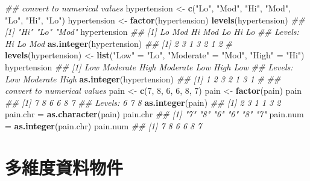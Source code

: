 \documentclass[
]{book}
\newenvironment{Shaded}{\begin{snugshade}}{\end{snugshade}}
\newcommand{\CommentTok}[1]{\textcolor[rgb]{0.56,0.35,0.01}{\textit{#1}}}
\newcommand{\DecValTok}[1]{\textcolor[rgb]{0.00,0.00,0.81}{#1}}
\newcommand{\KeywordTok}[1]{\textcolor[rgb]{0.13,0.29,0.53}{\textbf{#1}}}
\newcommand{\NormalTok}[1]{#1}
\newcommand{\StringTok}[1]{\textcolor[rgb]{0.31,0.60,0.02}{#1}}
\begin{document}
\begin{Shaded}
\begin{Highlighting}[]
\CommentTok{\#\# convert to numerical values}
\NormalTok{hypertension \textless{}{-}}\StringTok{ }\KeywordTok{c}\NormalTok{(}\StringTok{"Lo"}\NormalTok{, }\StringTok{"Mod"}\NormalTok{, }\StringTok{"Hi"}\NormalTok{, }\StringTok{"Mod"}\NormalTok{, }\StringTok{"Lo"}\NormalTok{, }\StringTok{"Hi"}\NormalTok{, }\StringTok{"Lo"}\NormalTok{)}
\NormalTok{hypertension \textless{}{-}}\StringTok{ }\KeywordTok{factor}\NormalTok{(hypertension)}
\KeywordTok{levels}\NormalTok{(hypertension)}
\CommentTok{\#\# [1] "Hi"  "Lo"  "Mod"}
\NormalTok{hypertension}
\CommentTok{\#\# [1] Lo  Mod Hi  Mod Lo  Hi  Lo }
\CommentTok{\#\# Levels: Hi Lo Mod}
\KeywordTok{as.integer}\NormalTok{(hypertension)}
\CommentTok{\#\# [1] 2 3 1 3 2 1 2}
\CommentTok{\#}
\KeywordTok{levels}\NormalTok{(hypertension) \textless{}{-}}\StringTok{ }\KeywordTok{list}\NormalTok{(}\StringTok{"Low"}\NormalTok{ =}\StringTok{ "Lo"}\NormalTok{, }
                             \StringTok{"Moderate"}\NormalTok{ =}\StringTok{ "Mod"}\NormalTok{, }
                             \StringTok{"High"}\NormalTok{ =}\StringTok{ "Hi"}\NormalTok{)}
\NormalTok{hypertension}
\CommentTok{\#\# [1] Low      Moderate High     Moderate Low      High     Low     }
\CommentTok{\#\# Levels: Low Moderate High}
\KeywordTok{as.integer}\NormalTok{(hypertension) }
\CommentTok{\#\# [1] 1 2 3 2 1 3 1}
\CommentTok{\#}
\CommentTok{\#\# convert to numerical values}
\NormalTok{pain \textless{}{-}}\StringTok{ }\KeywordTok{c}\NormalTok{(}\DecValTok{7}\NormalTok{, }\DecValTok{8}\NormalTok{, }\DecValTok{6}\NormalTok{, }\DecValTok{6}\NormalTok{, }\DecValTok{8}\NormalTok{, }\DecValTok{7}\NormalTok{)}
\NormalTok{pain \textless{}{-}}\StringTok{ }\KeywordTok{factor}\NormalTok{(pain)}
\NormalTok{pain}
\CommentTok{\#\# [1] 7 8 6 6 8 7}
\CommentTok{\#\# Levels: 6 7 8}
\KeywordTok{as.integer}\NormalTok{(pain)}
\CommentTok{\#\# [1] 2 3 1 1 3 2}
\NormalTok{pain.chr =}\StringTok{ }\KeywordTok{as.character}\NormalTok{(pain)}
\NormalTok{pain.chr}
\CommentTok{\#\# [1] "7" "8" "6" "6" "8" "7"}
\NormalTok{pain.num =}\StringTok{ }\KeywordTok{as.integer}\NormalTok{(pain.chr)}
\NormalTok{pain.num}
\CommentTok{\#\# [1] 7 8 6 6 8 7}
\end{Highlighting}
\end{Shaded}

\hypertarget{ux591aux7dadux5ea6ux8cc7ux6599ux7269ux4ef6}{%
\chapter{多維度資料物件}\label{ux591aux7dadux5ea6ux8cc7ux6599ux7269ux4ef6}}
\end{document}
